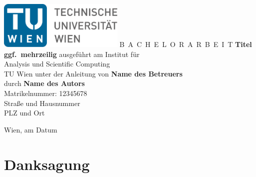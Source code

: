 

\begin{titlepage}
  \begin{center}
    \includegraphics[width=0.45\textwidth]{figures/TULogo.pdf}
    \vskip 1cm%
    {\LARGE B~\Large A~C~H~E~L~O~R~A~R~B~E~I~T}
    \vskip 8mm
    {\huge\bfseries\color{change}Titel \\[1ex] ggf.\ mehrzeilig}
    \vskip 1cm
    \large 
    ausgef\"uhrt am    
    \vskip 0.75cm
    {\Large Institut f\"ur\\[1ex] Analysis und Scientific Computing}\\[1ex]
    {\Large TU Wien}
    \vskip0.75cm
    unter der Anleitung von
    \vskip0.75cm
    {\Large\bfseries\color{change}Name des Betreuers}\\[1ex]
    \vskip 0.5cm
    durch
    \vskip 0.5cm
    {\Large\bfseries\color{change}Name des Autors}\\[1ex]
    Matrikelnummer: {\color{change}12345678}\\[1ex]
    {\color{change}Straße und Hausnummer}\\[1ex]
    {\color{change}PLZ und Ort}
  \end{center}
  
  \vfill
  
  \small
  Wien, am {\color{change} Datum} %
  \vspace*{-15mm}
\end{titlepage}

\cleardoublepage


\chapter*{Danksagung} %
\thispagestyle{empty}

